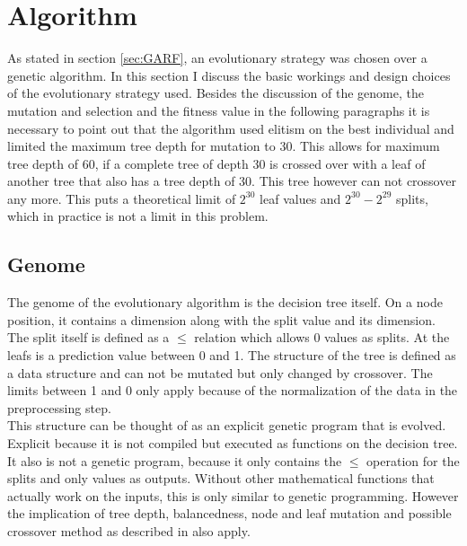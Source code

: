 \documentclass[conference]{IEEEtran}
\begin{document}
\section{Algorithm}
As stated in section \ref{sec:GARF}, an evolutionary strategy was chosen over a genetic algorithm. In this section I discuss the basic workings and design choices of the evolutionary strategy used. Besides the discussion of the genome, the mutation and selection and the fitness value in the following paragraphs it is necessary to point out that the algorithm used elitism on the best individual and limited the maximum tree depth for mutation to 30. This allows for maximum tree depth of 60, if a complete tree of depth 30 is crossed over with a leaf of another tree that also has a tree depth of 30. This tree however can not crossover any more.
This puts a theoretical limit of $2^{30}$ leaf values and $2^{30} - 2^{29}$ splits, which in practice is not a limit in this problem.\\

\subsection{Genome}
The genome of the evolutionary algorithm is the decision tree itself.
On a node position, it contains a dimension along with the split value and its dimension. The split itself is defined as a $\leq$ relation which allows 0 values as splits. 
At the leafs is a prediction value between 0 and 1. The structure of the tree is defined as a data structure and can not be mutated but only changed by crossover. The limits between 1 and 0 only apply because of the normalization of the data in the preprocessing step.\\
This structure can be thought of as an explicit genetic program that is evolved. Explicit because it is not compiled but executed as functions on the decision tree. It also is not a genetic program, because it only contains the $\leq$ operation for the splits and only values as outputs. Without other mathematical functions that actually work on the inputs, this is only similar to genetic programming. However the implication of tree depth, balancedness, node and leaf mutation and possible crossover method as described in \cite{banzhaf1998genetic} also apply.
\end{document}
